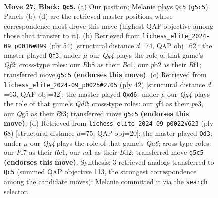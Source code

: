 \documentclass[11pt]{article}
\begin{document}
\clearpage

\begin{figure}[p]\centering
\begin{subfigure}{0.46\textwidth}\centering
\resizebox{\linewidth}{!}{%
\newchessgame
\chessboard[
  setfen={1r1r4/pp3pk1/8/6qp/b3PQ2/6Pp/PP3P2/RB2R1K1 b - - 0 27},
  showmover=false,
  pgfstyle=straightmove, color=movearrow, markmove={g5-c5}
]}
\caption{}
\end{subfigure}\hfill
\begin{subfigure}{0.46\textwidth}\centering
\resizebox{\linewidth}{!}{%
\newchessgame
\chessboard[
  setfen={5rk1/1R5p/p3rpp1/4b3/P2qP3/3p4/3P1QPP/2B2R1K w - - 1 28},
  showmover=false,
  pgfstyle=straightmove, color=movearrow, markmove={f2-f3}
]}
\caption{}
\end{subfigure}
\\[4pt]
\begin{subfigure}{0.46\textwidth}\centering
\resizebox{\linewidth}{!}{%
\newchessgame
\chessboard[
  setfen={r5k1/p5bp/1qpr1pp1/8/5PP1/4pB2/PP1Q3P/R3R1K1 w - - 0 22},
  showmover=false,
  pgfstyle=straightmove, color=movearrow, markmove={d2-d6}
]}
\caption{}
\end{subfigure}\hfill
\begin{subfigure}{0.46\textwidth}\centering
\resizebox{\linewidth}{!}{%
\newchessgame
\chessboard[
  setfen={r5k1/p2q3p/Q2b1rp1/2pp4/5P2/1P5P/P2BR1P1/2R3K1 w - - 3 35},
  showmover=false,
  pgfstyle=straightmove, color=movearrow, markmove={a6-d3}
]}
\caption{}
\end{subfigure}
\caption{\textbf{Move 27, Black: \texttt{Qc5}.} (a) Our position; Melanie plays \texttt{Qc5} (\texttt{g5c5}). Panels (b)--(d) are the retrieved master positions whose correspondence most drove this move (highest QAP objective among those that transfer to it). (b) Retrieved from \texttt{lichess\_elite\_2024-09\_p0016\#899} (ply 54) [structural distance $d$=74, QAP obj=62]: the master played \texttt{Qf3}; under $\mu$ our \emph{Qg4} plays the role of that game's \emph{Qf2}; cross-type roles: our \emph{R}b8 as their \emph{B}c1, our \emph{p}b2 as their \emph{R}f1; transferred move \texttt{g5c5} \textbf{(endorses this move)}. (c) Retrieved from \texttt{lichess\_elite\_2024-09\_p0025\#2705} (ply 42) [structural distance $d$=63, QAP obj=32]: the master played \texttt{Qxd6}; under $\mu$ our \emph{Qg4} plays the role of that game's \emph{Qd2}; cross-type roles: our \emph{q}f4 as their \emph{p}e3, our \emph{Q}g5 as their \emph{B}f3; transferred move \texttt{g5c5} \textbf{(endorses this move)}. (d) Retrieved from \texttt{lichess\_elite\_2024-09\_p0022\#623} (ply 68) [structural distance $d$=75, QAP obj=20]: the master played \texttt{Qd3}; under $\mu$ our \emph{Qg4} plays the role of that game's \emph{Qa6}; cross-type roles: our \emph{P}f7 as their \emph{R}c1, our \emph{r}a1 as their \emph{B}d2; transferred move \texttt{g5c5} \textbf{(endorses this move)}. Synthesis: 3 retrieved analogs transferred to \texttt{Qc5} (summed QAP objective 113, the strongest correspondence among the candidate moves); Melanie committed it via the \texttt{search} selector.}
\label{fig:thought-m53}
\end{figure}
\end{document}
